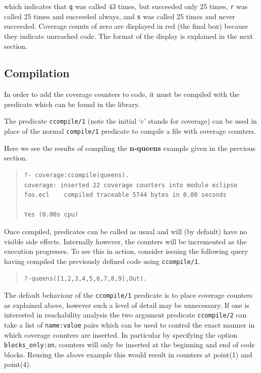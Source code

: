 which indicates that \verb+q+ was called 43 times, but succeeded only
25 times, \verb+r+ was called 25 times and succeeded always, and
\verb+s+ was called 25 times and never succeeded. Coverage counts of
zero are displayed in red (the final box) because they indicate
unreached code.  The format of the display is explained in the next
section.

\subsection{Compilation}
In order to add the coverage counters to code, it must be compiled with
the 
predicate which can be found in the
 library.

The predicate \verb+ccompile/1+ (note the initial `c' stands for
coverage) can be used in place of the normal \verb+compile/1+
predicate to compile a file with coverage counters.

Here we see the results of compiling the \textbf{n-queens} example
given in the previous section.
\begin{quote}\begin{verbatim}
?- coverage:ccompile(queens).
coverage: inserted 22 coverage counters into module eclipse
foo.ecl    compiled traceable 5744 bytes in 0.00 seconds

Yes (0.00s cpu)
\end{verbatim}\end{quote}

Once compiled, predicates can be called as usual and will (by default)
have no visible side effects.  Internally however, the counters will
be incremented as the execution progresses.  To see this in action,
consider issuing the following query having compiled the previously
defined code using \verb+ccompile/1+.
\begin{quote}\begin{alltt}
?- queens([1,2,3,4,5,6,7,8,9], Out).
\end{alltt}\end{quote}

The default behaviour of the \verb+ccompile/1+ predicate is to place
coverage counters as explained above, however such a level of detail
may be unnecessary.  If one is interested in reachability analysis the
two argument predicate \verb+ccompile/2+ 
 can take a list of \verb+name:value+ pairs
which can be used to control the exact manner in which coverage
counters are inserted.  In particular by specifying the
option \verb+blocks_only:on+, counters will only be inserted at the
beginning and end of code blocks. Reusing the above example this would
result in counters at point(1) and point(4).

